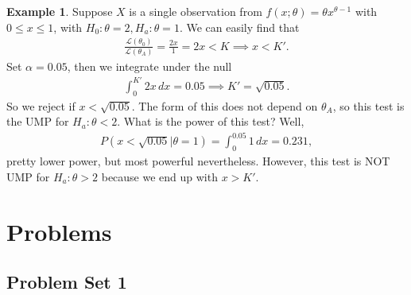 \documentclass{book}
\theoremstyle{definition}
\newtheorem{exmp}{Example}[section]
\newcommand{\lag}{\mathcal{L}}
\newcommand{\f}[2]{\frac{#1}{#2}}
\begin{document}
\begin{exmp}
	Suppose $X$ is a single observation from  $f(x;\theta) = \theta x^{\theta-1}$ with $0 \leq x \leq 1$, with $H_0 : \theta = 2, H_a: \theta = 1$. We can easily find that
	\begin{align}
	\f{\lag(\theta_0)}{\lag(\theta_A)} = \f{2x}{1} = 2x < K \implies x < K'.
	\end{align}
	Set $\alpha = 0.05$, then we integrate under the null
	\begin{align}
	\int^{K'}_0 2x \,dx = 0.05 \implies K' = \sqrt{0.05}.
	\end{align}
	So we reject if $x < \sqrt{0.05}$. The form of this does not depend on $\theta_A$, so this test is the UMP for $H_a: \theta < 2$. What is the power of this test? Well,
	\begin{align}
	P(x < \sqrt{0.05} \vert \theta = 1) = \int^{0.05}_0 1\,dx = 0.231,
	\end{align}
	pretty lower power, but most powerful nevertheless. However, this test is NOT UMP for $H_a: \theta > 2$ because we end up with $x > K'$. 
\end{exmp}































\newpage


\chapter{Problems}


\newpage

\section{Problem Set 1}
\end{document}
